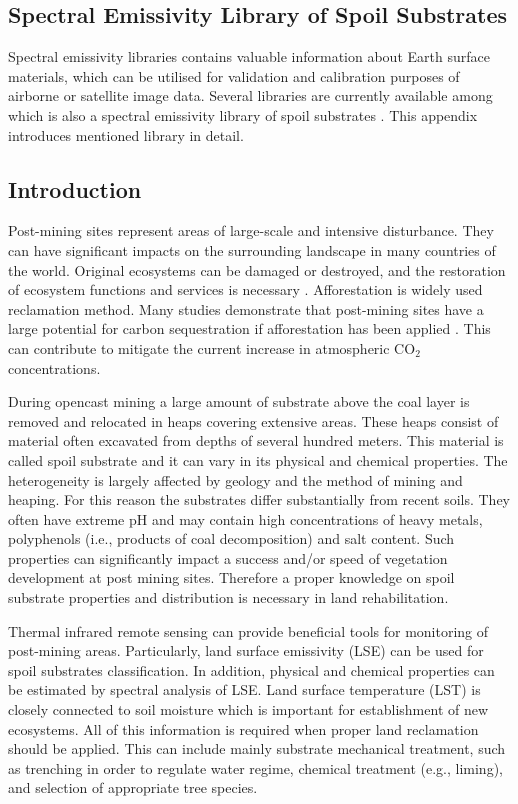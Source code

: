 \begin{appendices}

\chapter{Spectral Emissivity Library of Spoil Substrates}
\label{app:Library}

Spectral emissivity libraries contains valuable information about Earth surface materials, which can be utilised for validation and calibration purposes of airborne or satellite image data. Several libraries are currently available among which is also a spectral emissivity library of spoil substrates \cite{PP16}. This appendix introduces mentioned library in detail.

\section{Introduction}

Post-mining sites represent areas of large-scale and intensive disturbance. They can have significant impacts on the surrounding landscape in many countries of the world. Original ecosystems can be damaged or destroyed, and the restoration of ecosystem functions and services is necessary \cite{BH01}. Afforestation is widely used reclamation method. Many studies demonstrate that post-mining sites have a large potential for carbon sequestration if afforestation has been applied \cite{VF13, FL13, SL05, UL06}. This can contribute to mitigate the current increase in atmospheric $\mathrm{CO_2}$ concentrations.

During opencast mining a large amount of substrate above the coal layer is removed and relocated in heaps covering extensive areas. These heaps consist of material often excavated from depths of several hundred meters. This material is called spoil substrate and it can vary in its physical and chemical properties. The heterogeneity is largely affected by geology and the method of mining and heaping. For this reason the substrates differ substantially from recent soils. They often have extreme pH and may contain high concentrations of heavy metals, polyphenols (i.e., products of coal decomposition) and salt content. Such properties can significantly impact a success and/or speed of vegetation development at post mining sites. Therefore a proper knowledge on spoil substrate properties and distribution is necessary in land rehabilitation. 

Thermal infrared remote sensing can provide beneficial tools for monitoring of post-mining areas. Particularly, land surface emissivity (LSE) can be used for spoil substrates classification. In addition, physical and chemical properties can be estimated by spectral analysis of LSE. Land surface temperature (LST) is closely connected to soil moisture which is important for establishment of new ecosystems. All of this information is required when proper land reclamation should be applied. This can include mainly substrate mechanical treatment, such as trenching in order to regulate water regime, chemical treatment (e.g., liming), and selection of appropriate tree species.


\end{appendices}
